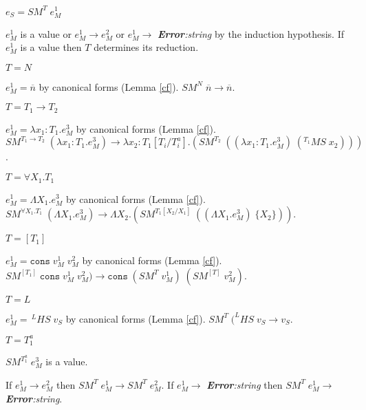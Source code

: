 \begin{case}
$e_{S}=SM^{T}\;e_{M}^{1}$

$e_{M}^{1}$ is a value or $e_{M}^{1}\rightarrow e_{M}^{2}$ or $e_{M}^{1}\rightarrow$ \emph{\textbf{Error}:\;string} by the induction hypothesis.  If $e_{M}^{1}$ is a value then $T$ determines its reduction.
\begin{subcase}
$T=N$

$e_{M}^{1}=\overline{n}$ by canonical forms (Lemma \ref{cf}).  $SM^{N}\;\overline{n}\rightarrow\overline{n}$.
\end{subcase}
\begin{subcase}
$T=T_{1}\rightarrow T_{2}$

$e_{M}^{1}=\lambda x_{1}:T_{1}.e_{M}^{3}$ by canonical forms (Lemma \ref{cf}).  $SM^{T_{1}\rightarrow T_{2}}\;(\lambda x_{1}:T_{1}.e_{M}^{3})\rightarrow\lambda x_{2}:T_{1}[T_{i}/T^{a}_{i}].(SM^{T_{2}}\;((\lambda x_{1}:T_{1}.e_{M}^{3})\;(^{T_{1}}MS\;x_{2})))$.
\end{subcase}
\begin{subcase}
$T=\forall X_{1}.T_{1}$

$e_{M}^{1}=\Lambda X_{1}.e_{M}^{3}$ by canonical forms (Lemma \ref{cf}).  $SM^{\forall X_{1}.T_{1}}\;(\Lambda X_{1}.e_{M}^{3})\rightarrow\Lambda X_{2}.(SM^{T_{1}[X_{2}/X_{1}]}\;((\Lambda X_{1}.e_{M}^{3})\;\lbrace X_{2}\rbrace))$.
\end{subcase}
\begin{subcase}
$T=[T_{1}]$

$e_{M}^{1}=\mathtt{cons}\;v_{M}^{1}\;v_{M}^{2}$ by canonical forms (Lemma \ref{cf}).  $SM^{[T_{1}]}\;\mathtt{cons}\;v_{M}^{1}\;v_{M}^{2})\rightarrow\mathtt{cons}\;(SM^{T}\;v_{M}^{1})\;(SM^{[T]}\;v_{M}^{2})$.
\end{subcase}
\begin{subcase}
$T=L$

$e_{M}^{1}=\,^{L}HS\;v_{S}$ by canonical forms (Lemma \ref{cf}).  $SM^{T}\;(^{L}HS\;v_{S}\rightarrow v_{S}$.
\end{subcase}
\begin{subcase}
$T=T_{1}^{a}$

$SM^{T_{1}^{a}}\;e_{M}^{3}$ is a value.
\end{subcase}
If $e_{M}^{1}\rightarrow e_{M}^{2}$ then $SM^{T}\;e_{M}^{1}\rightarrow SM^{T}\;e_{M}^{2}$.  If $e_{M}^{1}\rightarrow$ \emph{\textbf{Error}:\;string} then $SM^{T}\;e_{M}^{1}\rightarrow$ \emph{\textbf{Error}:\;string}.
\end{case}